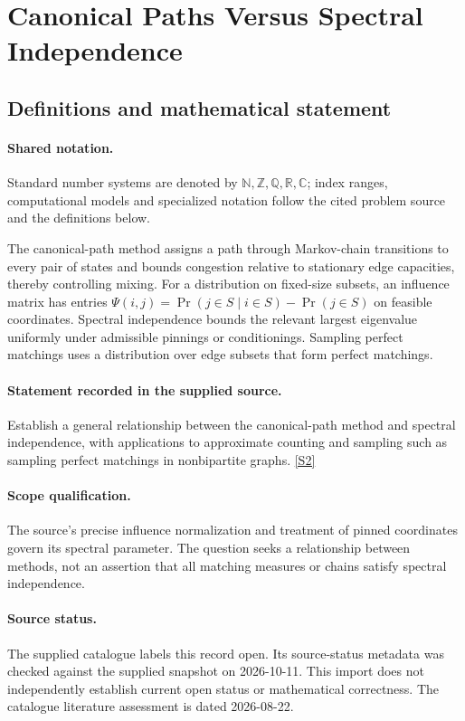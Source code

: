 \documentclass[11pt]{article}
\newcommand{\sref}[2]{\hyperlink{source:#1:#2}{[S#2]}}
\begin{document}
\section{Canonical Paths Versus Spectral Independence}\label{statement}

\subsection{Definitions and mathematical statement}

\paragraph{Shared notation.}Standard number systems are denoted by $\mathbb N,\mathbb Z,\mathbb Q,\mathbb R,\mathbb C$; index ranges, computational models and specialized notation follow the cited problem source and the definitions below.


The canonical-path method assigns a path through Markov-chain transitions to every pair of states and bounds congestion relative to stationary edge capacities, thereby controlling mixing. For a distribution on fixed-size subsets, an influence matrix has entries $\Psi(i,j)=\Pr(j\in S\mid i\in S)-\Pr(j\in S)$ on feasible coordinates. Spectral independence bounds the relevant largest eigenvalue uniformly under admissible pinnings or conditionings. Sampling perfect matchings uses a distribution over edge subsets that form perfect matchings.
\paragraph{Statement recorded in the supplied source.}
Establish a general relationship between the canonical-path method and spectral independence, with applications to approximate counting and sampling such as sampling perfect matchings in nonbipartite graphs. \sref{statement}{2}
\paragraph{Scope qualification.}
The source's precise influence normalization and treatment of pinned coordinates govern its spectral parameter. The question seeks a relationship between methods, not an assertion that all matching measures or chains satisfy spectral independence.
\paragraph{Source status.}
The supplied catalogue labels this record open. Its source-status metadata was checked against the supplied snapshot on 2026-10-11. This import does not independently establish current open status or mathematical correctness. The catalogue literature assessment is dated 2026-08-22.
\end{document}

